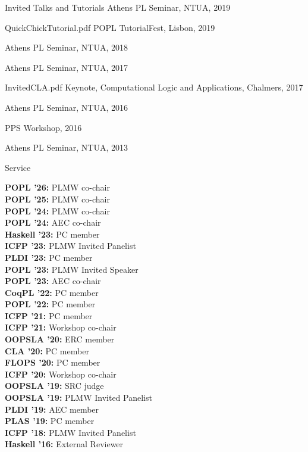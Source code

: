 \documentclass{resume} %
\begin{document}
\begin{rSection}{Invited Talks and Tutorials}
     {}
     {Athens PL Seminar, NTUA, 2019}

    {}
    {}
  
    {QuickChickTutorial.pdf}
    {POPL TutorialFest, Lisbon, 2019}

     {}
     {Athens PL Seminar, NTUA, 2018}

     {}
     {Athens PL Seminar, NTUA, 2017}

     {InvitedCLA.pdf}
     {Keynote, Computational Logic and Applications, Chalmers, 2017}

     {}
     {Athens PL Seminar, NTUA, 2016}

     {}
     {PPS Workshop, 2016}

     {}
     {Athens PL Seminar, NTUA, 2013}
     
\end{rSection}


\newcommand{\serve}[2]{
  {\bf #1:} #2 \\
  }


\begin{rSection}{Service}

  \serve{POPL '26}{PLMW co-chair}
  \serve{POPL '25}{PLMW co-chair}
  \serve{POPL '24}{PLMW co-chair}
  \serve{POPL '24}{AEC co-chair}  
  \serve{Haskell '23}{PC member}  
  \serve{ICFP '23}{PLMW Invited Panelist}
  \serve{PLDI '23}{PC member}
  \serve{POPL '23}{PLMW Invited Speaker}  
  \serve{POPL '23}{AEC co-chair}
  \serve{CoqPL '22}{PC member}
  \serve{POPL '22}{PC member}
  \serve{ICFP '21}{PC member}
  \serve{ICFP '21}{Workshop co-chair}
  \serve{OOPSLA '20}{ERC member}
  \serve{CLA '20}{PC member}
  \serve{FLOPS '20}{PC member}
  \serve{ICFP '20}{Workshop co-chair}
  \serve{OOPSLA '19}{SRC judge}
  \serve{OOPSLA '19}{PLMW Invited Panelist}
  \serve{PLDI '19}{AEC member}
  \serve{PLAS '19}{PC member}
  \serve{ICFP '18}{PLMW Invited Panelist}
  \serve{Haskell '16}{External Reviewer}
  
\end{rSection}
\end{document}
